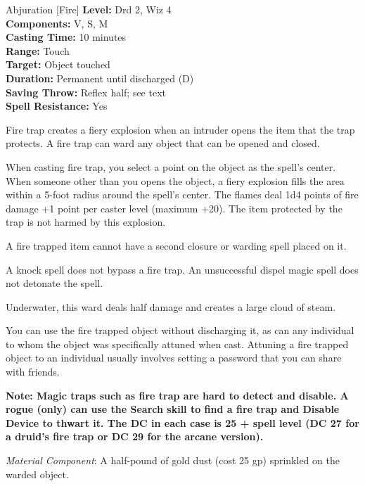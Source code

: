{Abjuration [Fire]}
{
	\textbf{Level:}
	Drd 2, Wiz 4\\
	\textbf{Components:}
	V, S, M\\
	\textbf{Casting Time:}
	10 minutes\\
	\textbf{Range:}
	Touch\\
	\textbf{Target:}
	Object touched\\
	\textbf{Duration:}
	Permanent until discharged (D)\\
	\textbf{Saving Throw:}
	Reflex half; see text\\
	\textbf{Spell Resistance:}
	Yes\\
}
{
	Fire trap creates a fiery explosion when an intruder opens the item that the trap protects. A fire trap can ward any object that can be opened and closed.

	When casting fire trap, you select a point on the object as the spell's center. When someone other than you opens the object, a fiery explosion fills the area within a 5-foot radius around the spell's center. The flames deal 1d4 points of fire damage +1 point per caster level (maximum +20). The item protected by the trap is not harmed by this explosion.

	A fire trapped item cannot have a second closure or warding spell placed on it.

	A knock spell does not bypass a fire trap.  An unsuccessful dispel magic spell does not detonate the spell.

	Underwater, this ward deals half damage and creates a large cloud of steam.

	You can use the fire trapped object without discharging it, as can any individual to whom the object was specifically attuned when cast. Attuning a fire trapped object to an individual usually involves setting a password that you can share with friends.

	\textbf{Note: Magic traps such as fire trap are hard to detect and disable. A rogue (only) can use the Search skill to find a fire trap and Disable Device to thwart it. The DC in each case is 25 + spell level (DC 27 for a druid's fire trap or DC 29 for the arcane version).}

	\textit{Material Component}:
	A half-pound of gold dust (cost 25 gp) sprinkled on the warded object.

}

